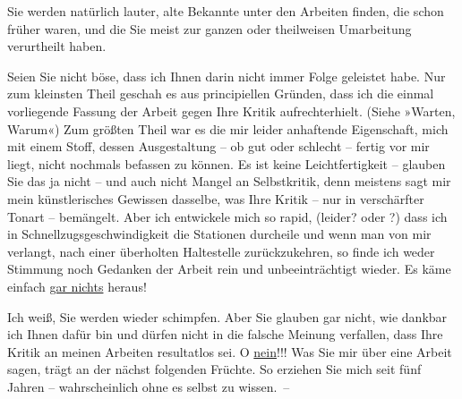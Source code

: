 \pstart
           Sie werden natürlich lauter, alte Bekannte unter den Arbeiten finden, die schon
               früher \label{K_L03727-3v}\label{K_L03727-3} waren, und die Sie meist zur
               ganzen oder theilweisen Umarbeitung verurtheilt haben.\pend
           
\pstart
           Seien Sie nicht böse, dass ich Ihnen darin nicht immer Folge geleistet habe. Nur zum
               kleinsten Theil geschah es aus principiellen Grün{\pb}den, dass ich die
               einmal vorliegende Fassung der Arbeit gegen Ihre Kritik aufrechterhielt. (Siehe »Warten, Warum«) Zum größten Theil war es die mir leider anhaftende Eigenschaft, mich
               mit einem Stoff, dessen Ausgestaltung – ob gut oder schlecht – fertig vor mir liegt,
               nicht nochmals befassen zu können. Es ist keine Leichtfertigkeit – glauben Sie das ja
               nicht – und auch nicht Mangel an Selbstkritik, denn meistens sagt mir mein
               künstlerisches Gewissen dasselbe, was Ihre Kritik – nur in verschärfter Tonart –
               bemängelt. Aber ich entwickele mich so rapid, (leider? oder \label{K_L03727-4v}\label{K_L03727-4}?) dass ich in Schnellzugsgeschwindigkeit die Stationen durcheile und
               wenn man von mir verlangt, nach einer überholten Haltestelle zurückzukehren, so finde
               ich weder Stimmung noch Gedanken der Arbeit {\pb}rein und unbeeinträchtigt
               wieder. Es käme einfach \uline{gar nichts} heraus!\pend
           
\pstart
           Ich weiß, Sie werden wieder schimpfen. Aber Sie glauben gar nicht, wie dankbar ich
               Ihnen dafür bin und dürfen nicht in die falsche Meinung verfallen, dass Ihre Kritik
               an meinen Arbeiten resultatlos sei. O \uline{nein}!!! Was Sie
               mir über eine Arbeit sagen, trägt an der nächst folgenden Früchte. So erziehen Sie
               mich seit fünf Jahren – wahrscheinlich ohne es selbst zu wissen. –\pend
           
